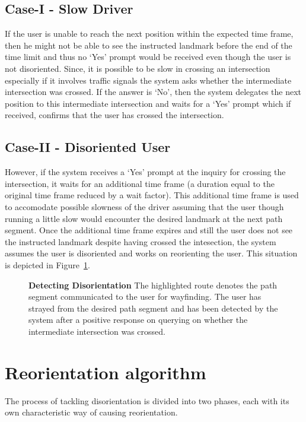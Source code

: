 \documentclass{iitkthesis}
\begin{document}
\subsection*{Case-I - Slow Driver}
If the user is unable to reach the next position within the expected time 
frame, then he might not be able to see the instructed landmark before 
the end of the time limit and thus no `Yes' prompt would be received even 
though the user is not disoriented. Since, it is  possible to be 
slow in crossing an intersection especially if it involves traffic 
signals the system asks whether 
the intermediate intersection was crossed. If the answer is `No', then 
the system delegates the next position to this intermediate intersection 
and waits for a `Yes' prompt which if received, confirms that the user 
has crossed the intersection. 

\subsection*{Case-II - Disoriented User}
However, if the system receives a `Yes' prompt at the inquiry for 
crossing the intersection, it waits for an additional time frame (a duration
equal to the original time frame reduced by a wait factor). This 
additional time frame is used to accomodate possible slowness of the 
driver assuming that the user though running a little slow would 
encounter the desired landmark at the next path segment. Once the 
additional time frame expires and still the user does not see the instructed 
landmark despite having crossed the intesection, the system assumes the
user is disoriented and works on reorienting the user.
This situation is depicted in Figure~\ref{fig:detect}. 
\begin{figure}
\centering
{}
\caption{\textbf{Detecting Disorientation} The highlighted route denotes 
the path segment communicated to the user for wayfinding. The user has 
strayed from the desired path segment and has been detected by the 
system after a positive response on querying on whether the intermediate 
intersection was crossed.}
\label{fig:detect}
 \end{figure}
\section{Reorientation algorithm}
\label{sec:reorient}
The process of tackling disorientation is divided into two phases, each 
with its own characteristic way of causing reorientation. 
\end{document}
